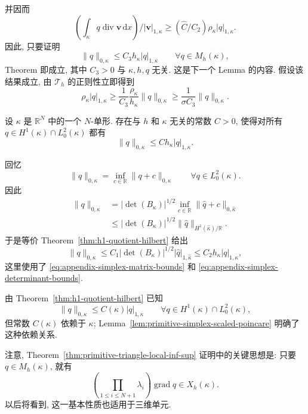 \begin{Proof}
并因而
\[
\left(\int_\kappa q\operatorname{div}\mathbf v\,\mathrm dx\right)
/|\mathbf v|_{1,\kappa}
\geq(\hat C/C_2)\rho_\kappa|q|_{1,\kappa}.
\]
因此, 只要证明
\[
\|q\|_{0,\kappa}\leq C_3h_\kappa|q|_{1,\kappa}
\qquad\forall q\in M_h(\kappa),
\]
Theorem 即成立, 其中 $C_3>0$ 与 $\kappa,h,q$ 无关.
这是下一个 Lemma 的内容. 假设该结果成立, 由
$\mathcal{T}_h$ 的正则性立即得到
\[
\rho_\kappa|q|_{1,\kappa}
\geq\frac1{C_3}\frac{\rho_\kappa}{h_\kappa}\|q\|_{0,\kappa}
\geq\frac1{\sigma C_3}\|q\|_{0,\kappa}.
\]
\end{Proof}

\setcounter{statement}{4}
\begin{Lemma}\label{lem:primitive-simplex-scaled-poincare}
设 $\kappa$ 是 $\mathbb{R}^N$ 中的一个 $N$-单形. 存在与 $h$ 和
$\kappa$ 无关的常数 $C>0$, 使得对所有
$q\in H^1(\kappa)\cap L_0^2(\kappa)$ 都有
\begin{equation}\label{eq:primitive-simplex-scaled-poincare}
\|q\|_{0,\kappa}\leq Ch_\kappa|q|_{1,\kappa}.
\end{equation}
\end{Lemma}

\begin{Proof}
回忆
\[
\|q\|_{0,\kappa}
=\inf_{c\in\mathbb R}\|q+c\|_{0,\kappa}
\qquad\forall q\in L_0^2(\kappa).
\]
因此
\[
\begin{aligned}
\|q\|_{0,\kappa}
&=|\det(B_\kappa)|^{1/2}
\inf_{c\in\mathbb R}\|\hat q+c\|_{0,\hat\kappa}\\
&\leq|\det(B_\kappa)|^{1/2}
\|\hat q\|_{H^1(\hat\kappa)/\mathbb R}.
\end{aligned}
\]
于是等价 Theorem~\ref{thm:h1-quotient-hilbert} 给出
\[
\|q\|_{0,\kappa}
\leq C_1|\det(B_\kappa)|^{1/2}|\hat q|_{1,\hat\kappa}
\leq C_2h_\kappa|q|_{1,\kappa},
\]
这里使用了 \eqref{eq:appendix-simplex-matrix-bounds} 和
\eqref{eq:appendix-simplex-determinant-bounds}.
\end{Proof}

\setcounter{statement}{3}
\begin{Remark}\label{rem:primitive-simplex-scaled-poincare-dependence}
由 Theorem~\ref{thm:h1-quotient-hilbert} 已知
\[
\|q\|_{0,\kappa}\leq C(\kappa)|q|_{1,\kappa}
\qquad\forall q\in H^1(\kappa)\cap L_0^2(\kappa),
\]
但常数 $C(\kappa)$ 依赖于 $\kappa$;
Lemma~\ref{lem:primitive-simplex-scaled-poincare} 明确了这种依赖关系.
\end{Remark}

\setcounter{statement}{4}
\begin{Remark}\label{rem:primitive-bubble-gradient-property}
注意, Theorem~\ref{thm:primitive-triangle-local-inf-sup} 证明中的关键思想是:
只要 $q\in M_h(\kappa)$, 就有
\[
\left(\prod_{1\leq i\leq N+1}\lambda_i\right)
\operatorname{grad}q\in X_h(\kappa).
\]
以后将看到, 这一基本性质也适用于三维单元.
\end{Remark}

